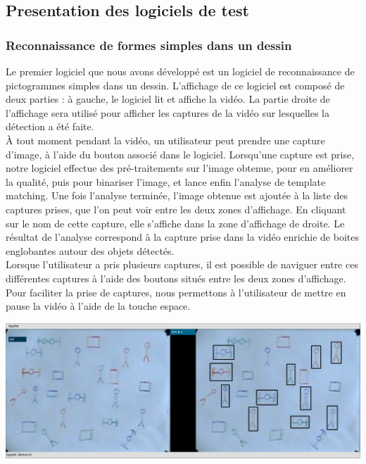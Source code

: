 \subsection{Presentation des logiciels de test}

\subsubsection{Reconnaissance de formes simples dans un dessin}

Le premier logiciel que nous avons développé est un logiciel de reconnaissance de pictogrammes simples dans un dessin. L'affichage de ce logiciel est composé de deux parties : à gauche, le logiciel lit et affiche la vidéo. La partie droite de l'affichage sera utilisé pour afficher les captures de la vidéo sur lesquelles la détection a été faite.\\

À tout moment pendant la vidéo, un utilisateur peut prendre une capture d'image, à l'aide du bouton associé dans le logiciel. Lorsqu'une capture est prise, notre logiciel effectue des pré-traitements sur l'image obtenue, pour en améliorer la qualité, puis pour binariser l'image, et lance enfin l'analyse de template matching. Une fois l'analyse terminée, l'image obtenue est ajoutée à la liste des captures prises, que l'on peut voir entre les deux zones d'affichage. En cliquant sur le nom de cette capture, elle s'affiche dans la zone d'affichage de droite. Le résultat de l'analyse correspond à la capture prise dans la vidéo enrichie de boites englobantes autour des objets détectés.\\

Lorsque l'utilisateur a pris plusieurs captures, il est possible de naviguer entre ces différentes captures à l'aide des boutons situés entre les deux zones d'affichage.\\

Pour faciliter la prise de captures, nous permettons à l'utilisateur de mettre en pause la vidéo à l'aide de la touche espace.\\

\begin{center}
\includegraphics[width=\textwidth]{images/capture1.png}
\end{center}

